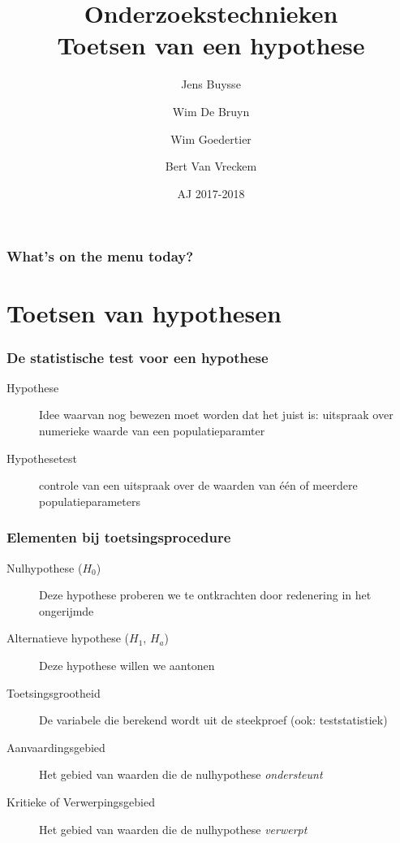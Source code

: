 \documentclass{beamer}
\title[Intro]{Onderzoekstechnieken\\Toetsen van een hypothese}
\author{Jens Buysse \and Wim {De Bruyn} \and Wim Goedertier \and Bert {Van Vreckem}}
\date{AJ 2017-2018}
\begin{document}

\HoGentLogo

\titleframe



\begin{frame}
  \frametitle{What's on the menu today?}

  \tableofcontents
\end{frame}

\section{Toetsen van hypothesen}
\sectionframelogo{}

\begin{frame}
  \frametitle{De statistische test voor een hypothese}

  \begin{description}
    \item[Hypothese] Idee waarvan nog bewezen moet worden dat het juist is: uitspraak over numerieke waarde van een populatieparamter
    \item[Hypothesetest] controle van een uitspraak over de waarden van één of meerdere populatieparameters
  \end{description}
\end{frame}

\begin{frame}
  \frametitle{Elementen bij toetsingsprocedure}

  \begin{description}
    \item[Nulhypothese ($H_0$)] Deze hypothese proberen we te ontkrachten door redenering in het ongerijmde
    \item[Alternatieve hypothese ($H_1$, $H_a$)] Deze hypothese willen we aantonen
    \item[Toetsingsgrootheid] De variabele die berekend wordt uit de steekproef (ook: teststatistiek)
    \item[Aanvaardingsgebied] Het gebied van waarden die de nulhypothese \emph{ondersteunt}
    \item[Kritieke of Verwerpingsgebied] Het gebied van waarden die de nulhypothese \emph{verwerpt}
  \end{description}
\end{frame}
\end{document}
